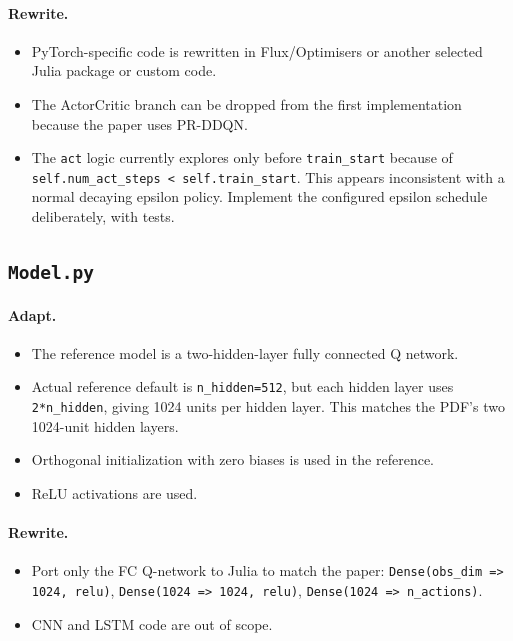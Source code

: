 \documentclass[11pt]{article}
\begin{document}
\paragraph{Rewrite.}

\begin{itemize}
\item PyTorch-specific code is rewritten in Flux/Optimisers or another selected Julia package or custom code.
\item The ActorCritic branch can be dropped from the first implementation because the paper uses PR-DDQN.
\item The \texttt{act} logic currently explores only before \texttt{train\_start} because of \texttt{self.num\_act\_steps < self.train\_start}. This appears inconsistent with a normal decaying epsilon policy. Implement the configured epsilon schedule deliberately, with tests.
\end{itemize}


\subsection{\texttt{Model.py}}

\paragraph{Adapt.}

\begin{itemize}
\item The reference model is a two-hidden-layer fully connected Q network.
\item Actual reference default is \texttt{n\_hidden=512}, but each hidden layer uses \texttt{2*n\_hidden}, giving 1024 units per hidden layer. This matches the PDF's two 1024-unit hidden layers.
\item Orthogonal initialization with zero biases is used in the reference.
\item ReLU activations are used.
\end{itemize}

\paragraph{Rewrite.}

\begin{itemize}
\item Port only the FC Q-network to Julia to match the paper:
\texttt{Dense(obs\_dim => 1024, relu)}, \texttt{Dense(1024 => 1024, relu)}, \texttt{Dense(1024 => n\_actions)}.
\item CNN and LSTM code are out of scope.
\end{itemize}
\end{document}
